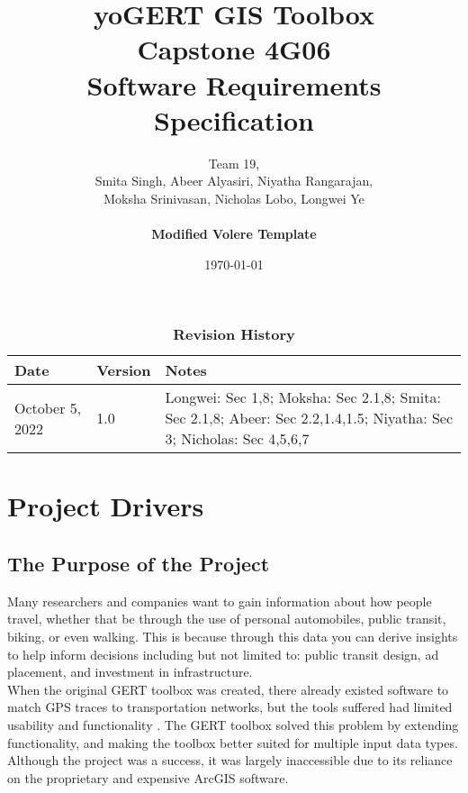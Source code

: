 \documentclass[12pt, titlepage]{article}
\title{\textbf{yoGERT GIS Toolbox}\\ Capstone 4G06\\ Software Requirements Specification}
\author{Team 19,
		\\ Smita Singh, Abeer Alyasiri, Niyatha Rangarajan,\\ Moksha Srinivasan, Nicholas Lobo, Longwei Ye \\\\
		\textbf{Modified Volere Template}
}
\date{\today}
\begin{document}
\nocite{*}
\maketitle

\tableofcontents
\listoftables
\listoffigures

\begin{table}[H]
\caption{\bf Revision History}
\begin{tabularx}{\textwidth}{p{3cm}p{2cm}X}
\toprule {\bf Date} & {\bf Version} & {\bf Notes}\\
\midrule
October 5, 2022 & 1.0 & Longwei: Sec 1,8; Moksha: Sec 2.1,8; Smita: Sec 2.1,8; Abeer: Sec 2.2,1.4,1.5; Niyatha: Sec 3; Nicholas: Sec 4,5,6,7 \\
\bottomrule
\end{tabularx}
\end{table}

\newpage



\section{Project Drivers}

\subsection{The Purpose of the Project}
Many researchers and companies want to gain information about how people travel, whether that be through the use of personal automobiles, public transit, biking, or even walking. This is because through this data you can derive insights to help inform decisions including but not limited to: public transit design, ad placement, and investment in infrastructure. \\

\noindent When the original GERT toolbox was created, there already existed software to match GPS traces to transportation networks, but the tools suffered had limited usability and functionality \cite{GISBASED}. The GERT toolbox solved this problem by extending functionality, and making the toolbox better suited for multiple input data types. Although the project was a success, it was largely inaccessible due to its reliance on the proprietary and expensive ArcGIS software. \\
\end{document}

